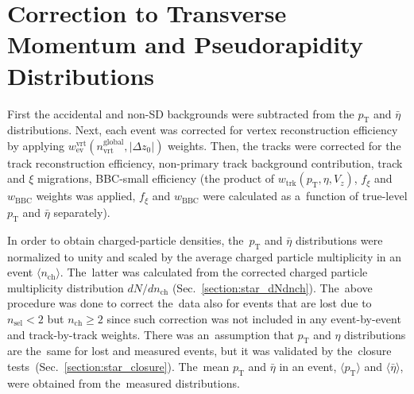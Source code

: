 \section{Correction to Transverse Momentum and Pseudorapidity Distributions}\label{section:star_dNdeta_dNdpt}
First the accidental and non-SD backgrounds were subtracted from the $p_\textrm{T}$ and $\bar{\eta}$ distributions. Next, each event was  corrected for vertex reconstruction efficiency by applying $w_\textrm{ev}^\textrm{vrt}(n_\textrm{vrt}^\textrm{global},|\Delta z_0|)$ weights. Then, the tracks were corrected for the track reconstruction efficiency, non-primary track background contribution, track and $\xi$ migrations, BBC-small efficiency (the product of $w_\textrm{trk}(p_\textrm{T},\eta,V_z)$, $f_\xi$ and $w_\textrm{BBC}$ weights was applied, $f_\xi$ and $w_\textrm{BBC}$ were calculated as a~function of true-level $p_\textrm{T}$ and $\bar{\eta}$ separately). 


In order to obtain  charged-particle densities, the~$p_\textrm{T}$ and $\bar{\eta}$ distributions   were normalized to unity and scaled by the average charged particle multiplicity in an event $\langle n_\textrm{ch}\rangle$. The~latter was calculated from the corrected charged particle multiplicity distribution $dN/dn_\textrm{ch}$ (Sec.~\ref{section:star_dNdnch}).
The~above procedure was done to  correct  the~data also for events that are lost due to $n_\textrm{sel}<2$ but $n_\textrm{ch}\geq 2$ since such correction  was not included in any event-by-event and track-by-track weights. There was an~assumption that $p_\text{T}$ and $\eta$ distributions are the~same for lost and measured events, but it was validated by the~closure tests~(Sec.~\ref{section:star_closure}).
The~mean $p_\textrm{T}$ and $\bar{\eta}$ in an event, $\langle p_\textrm{T}\rangle$ and $\langle \bar{\eta}\rangle$, were obtained from the~measured distributions.